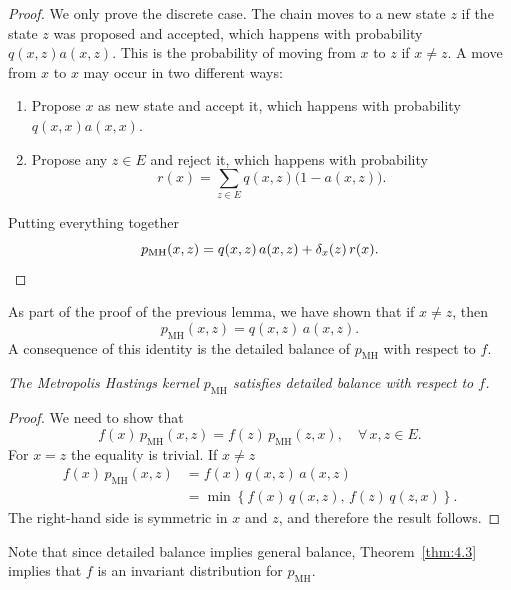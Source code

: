 \begin{proof}
We only prove the discrete case. The chain moves to a new state $z$ if the state $z$ was
proposed and accepted, which happens with probability $q(x, z) a(x, z)$. This is the probability of
moving from $x$ to $z$ if $x \neq z$. A move from $x$ to $x$ may occur in two different ways:
\begin{enumerate}
\item Propose $x$ as new state and accept it, which happens with probability $q(x, x) a(x, x)$.
\item Propose any $z \in E$ and reject it, which happens with probability
\[
  r(x) = \sum_{z \in E} q(x, z)\bigl(1 - a(x, z)\bigr).
\]
\end{enumerate}
Putting everything together
\[
  p_{\mathrm{MH}}(x, z) = q(x, z)\, a(x, z) + \delta_x(z)\, r(x). \qedhere
\]
\end{proof}

As part of the proof of the previous lemma, we have shown that if $x \neq z$, then
\[
  p_{\mathrm{MH}}(x, z) = q(x, z)\, a(x, z).
\]
A consequence of this identity is the detailed balance of $p_{\mathrm{MH}}$ with respect to $f$.

\begin{theorem}
\label{thm:4.3}
\textit{The Metropolis Hastings kernel $p_{\mathrm{MH}}$ satisfies detailed balance with respect to $f$.}
\end{theorem}

\begin{proof}
We need to show that
\[
  f(x)\, p_{\mathrm{MH}}(x, z) = f(z)\, p_{\mathrm{MH}}(z, x), \quad \forall\, x, z \in E.
\]
For $x = z$ the equality is trivial. If $x \neq z$
\begin{align*}
  f(x)\, p_{\mathrm{MH}}(x, z)
  &= f(x)\, q(x, z)\, a(x, z) \\
  &= \min\!\left\{f(x)\, q(x, z),\, f(z)\, q(z, x)\right\}.
\end{align*}
The right-hand side is symmetric in $x$ and $z$, and therefore the result follows.
\end{proof}

Note that since detailed balance implies general balance, Theorem~\ref{thm:4.3} implies that $f$ is an
invariant distribution for $p_{\mathrm{MH}}$.
